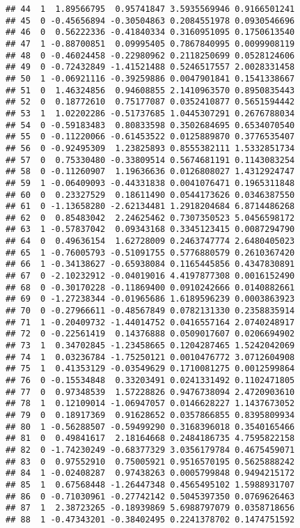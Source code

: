 \documentclass[
]{article}
\begin{document}
\begin{verbatim}
## 44  1  1.89566795  0.95741847 3.5935569946 0.9166501241
## 45  0 -0.45656894 -0.30504863 0.2084551978 0.0930546696
## 46  0  0.56222336 -0.41840334 0.3160951095 0.1750613540
## 47  1 -0.88700851  0.09995405 0.7867840995 0.0099908119
## 48  0 -0.46024458 -0.22980962 0.2118250699 0.0528124606
## 49  0 -0.72432849 -1.41521488 0.5246517557 2.0028331458
## 50  1 -0.06921116 -0.39259886 0.0047901841 0.1541338667
## 51  0  1.46324856  0.94608855 2.1410963570 0.8950835443
## 52  0  0.18772610  0.75177087 0.0352410877 0.5651594442
## 53  1  1.02202286 -0.51737685 1.0445307291 0.2676788034
## 54  0 -0.59183483  0.80833598 0.3502684695 0.6534070540
## 55  0 -0.11220066 -0.61453522 0.0125889870 0.3776535407
## 56  0 -0.92495309  1.23825893 0.8555382111 1.5332851734
## 57  0  0.75330480 -0.33809514 0.5674681191 0.1143083254
## 58  0 -0.11260907  1.19636636 0.0126808027 1.4312924747
## 59  1 -0.06409093 -0.44331838 0.0041076471 0.1965311848
## 60  0  0.23327529  0.18611490 0.0544173626 0.0346387550
## 61  0 -1.13658280 -2.62134481 1.2918204684 6.8714486268
## 62  0  0.85483042  2.24625462 0.7307350523 5.0456598172
## 63  1 -0.57837042  0.09343168 0.3345123415 0.0087294790
## 64  0  0.49636154  1.62728009 0.2463747774 2.6480405023
## 65  1 -0.76005793 -0.51091755 0.5776880579 0.2610367420
## 66  1 -0.34138627 -0.65938084 0.1165445856 0.4347830891
## 67  0 -2.10232912 -0.04019016 4.4197877308 0.0016152490
## 68  0 -0.30170228 -0.11869400 0.0910242666 0.0140882661
## 69  0 -1.27238344 -0.01965686 1.6189596239 0.0003863923
## 70  0 -0.27966611 -0.48567849 0.0782131330 0.2358835914
## 71  1 -0.20409732 -1.44014752 0.0416557164 2.0740248917
## 72  0 -0.22561419  0.14376888 0.0509017607 0.0206694902
## 73  1  0.34702845 -1.23458665 0.1204287465 1.5242042069
## 74  1  0.03236784 -1.75250121 0.0010476772 3.0712604908
## 75  1  0.41353129 -0.03549629 0.1710081275 0.0012599864
## 76  0 -0.15534848  0.33203491 0.0241331492 0.1102471805
## 77  0  0.97348539  1.57228826 0.9476738094 2.4720903610
## 78  1  0.12109014 -1.06947057 0.0146628227 1.1437673052
## 79  0  0.18917369  0.91628652 0.0357866855 0.8395809934
## 80  1 -0.56288507 -0.59499290 0.3168396018 0.3540165466
## 81  0  0.49841617  2.18164668 0.2484186735 4.7595822158
## 82  0 -1.74230249 -0.68377329 3.0356179784 0.4675459071
## 83  0  0.97552910  0.75005921 0.9516570195 0.5625888242
## 84  1 -0.02408287  0.97438263 0.0005799848 0.9494215172
## 85  1  0.67568448 -1.26447348 0.4565495102 1.5988931707
## 86  0 -0.71030961 -0.27742142 0.5045397350 0.0769626463
## 87  1  2.38723265 -0.18939869 5.6988797079 0.0358718656
## 88  1 -0.47343201 -0.38402495 0.2241378702 0.1474751592

\end{verbatim}
\end{document}
